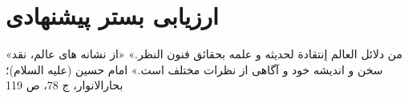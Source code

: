 \chapter{ارزیابی بستر پیشنهادی}
\label{ch5}
\bottomquote
{«من دلائل العالم إنتقادة لحدیثه و علمه بحقائق فنون النظر.»}
{«از نشانه های عالم، نقد سخن و اندیشه خود و آگاهی از نظرات مختلف است.»}
{امام حسین (علیه السلام)؛ بحارالانوار، ج 78، ص 119}

\clearpage

%
%
%
%


